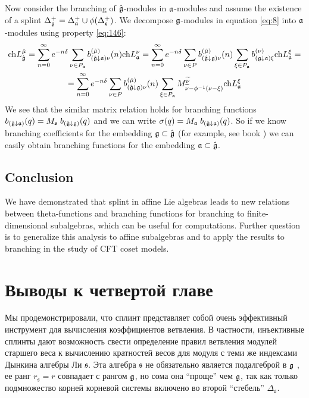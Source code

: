 Now consider the branching of $\hat{\mathfrak{g}}$-modules in $\mathfrak{a}$-modules and
assume the existence of a splint
$\Delta^{+}_{\mathfrak{g}}=\Delta^{+}_{\mathfrak{a}}\cup \phi(\Delta^{+}_{\mathfrak{s}})$.
We decompose $\mathfrak{g}$-modules in equation \eqref{eq:8} into
$\mathfrak{a}$-modules using property \eqref{eq:146}:
\begin{multline}
  \label{eq:125}
  \mathrm{ch}L^{\hat{\mu}}_{\hat{\mathfrak{g}}}=
\sum_{n=0}^{\infty}e^{-n\delta} \sum_{\nu\in P_{\mathfrak{a}}} b^{(\hat{\mu})}_{(\hat{\mathfrak{g}}\downarrow\mathfrak{a})\nu}(n) \mathrm{ch} L^{\nu}_{\mathfrak{a}}=
\sum_{n=0}^{\infty} e^{-n\delta} \sum_{\nu\in P} b^{(\hat{\mu})}_{(\hat{\mathfrak{g}}\downarrow\mathfrak{g} )\nu}(n) \sum_{\xi\in P_{\mathfrak{a}}} b^{(\nu)}_{(\mathfrak{g}\downarrow \mathfrak{a}) \xi}\mathrm{ch} L^{\xi}_{\mathfrak{a}}=\\
=\sum_{n=0}^{\infty} e^{-n\delta} \sum_{\nu\in P} b^{(\hat{\mu})}_{(\hat{\mathfrak{g}}\downarrow\mathfrak{g} )\nu}(n) \sum_{\xi\in P_{\mathfrak{a}}} M^{\widetilde{\nu}}_{  \widetilde{\nu}-\phi^{-1}( \nu-\xi )}\mathrm{ch} L^{\xi}_{\mathfrak{a}}
\end{multline}
We see that the similar matrix relation holds for branching
functions $b_{(\hat{\mathfrak{g}}\downarrow\mathfrak{a})}(q)= M_{\mathfrak{s}}\;
b_{(\hat{\mathfrak{g}}\downarrow\mathfrak{g})}(q)$ and we can write
$\sigma(q)=M_{\mathfrak{a}}\; b_{(\hat{\mathfrak{g}}\downarrow\mathfrak{a})}(q)$. So if we know
branching coefficients for the embedding $\mathfrak{g}\subset\hat{\mathfrak{g}}$ (for
example, see book \cite{kass1990ala}) we can easily obtain
branching functions for the embedding $\mathfrak{a}\subset \hat{\mathfrak{g}}$.
\subsection*{Conclusion}
\label{sec:conclusion} We have demonstrated that splint in affine
Lie algebras leads to new relations between theta-functions and
branching functions for branching to finite-dimensional
subalgebras, which can be useful for computations. Further
question is to generalize this analysis to affine subalgebras and
to apply the results to branching in the study of CFT coset
models.

\section{Выводы к четвертой главе}

\label{sec:4-conclusions}
Мы продемонстрировали, что сплинт представляет собой очень эффективный инструмент для вычисления коэффициентов ветвления.  В частности, инъективные сплинты дают возможность свести определение правил ветвления модулей старшего веса к вычислению кратностей весов для модуля с теми же индексами Дынкина алгебры Ли $\mathfrak{s}$. Эта алгебра $\mathfrak{s}$ не обязательно является подалгеброй в  $\mathfrak{g}$ , ее ранг $r_{\mathfrak{s}}=r$ совпадает с рангом $\mathfrak{g}$, но сома она ``проще'' чем  $\mathfrak{g}$, так как только подмножество корней корневой системы включено во второй ``стебель''  $\Delta_{\mathfrak{s}}$.

